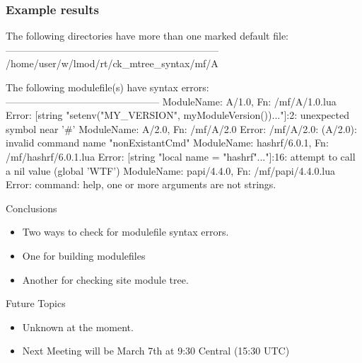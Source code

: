 \documentclass{beamer}
\begin{document}
\begin{frame}[fragile]
    \frametitle{Example results}
 {\tiny
    \begin{semiverbatim}
The following directories have more than one marked default file:
-----------------------------------------------------------------
  /home/user/w/lmod/rt/ck_mtree_syntax/mf/A


The following modulefile(s) have syntax errors:
-----------------------------------------------
  ModuleName: A/1.0, Fn: /mf/A/1.0.lua 
     Error: [string "setenv("MY_VERSION", myModuleVersion())..."]:2: unexpected symbol near '#' 
  ModuleName: A/2.0, Fn: /mf/A/2.0 
     Error: /mf/A/2.0: (A/2.0): invalid command name "nonExistantCmd"
  ModuleName: hashrf/6.0.1, Fn: /mf/hashrf/6.0.1.lua 
     Error: [string "local name = "hashrf"..."]:16: attempt to call a nil value (global 'WTF') 
  ModuleName: papi/4.4.0, Fn: /mf/papi/4.4.0.lua 
     Error: command: help, one or more arguments are not strings. 
    \end{semiverbatim}
}
\end{frame}

\begin{frame}{Conclusions}
  \begin{itemize}
    \item Two ways to check for modulefile syntax errors.
    \item One for building modulefiles
    \item Another for checking site module tree.
  \end{itemize}
\end{frame}

\begin{frame}{Future Topics}
  \begin{itemize}
    \item Unknown at the moment.
    \item Next Meeting will be March 7th at 9:30 Central (15:30 UTC)
  \end{itemize}
\end{frame}
\end{document}
